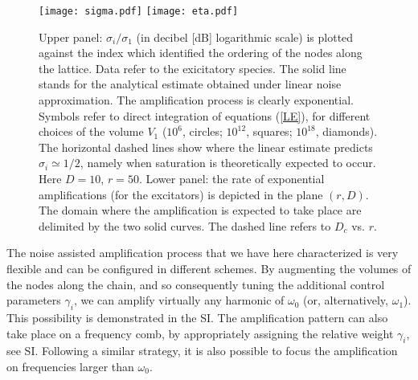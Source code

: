 \documentclass[showpacs,prl,superscriptaddress,nofootinbib, twocolumn]{revtex4}
\begin{document}
 \begin{figure}
 \centering
   {\texttt{[image: sigma.pdf]}}
   {\texttt{[image: eta.pdf]}}
   \caption{Upper panel: $\sigma_i / \sigma_1$ (in decibel [dB] logarithmic scale) is plotted against the index which identified the ordering of the nodes  along the lattice. Data refer to the exicitatory species. The solid line stands for the analytical estimate obtained under linear noise approximation. The amplification process is clearly exponential.  Symbols refer to direct integration of equations (\ref{LE}), for different choices of the volume $V_1$ ($10^6$, circles; $10^{12}$, squares; $10^{18}$, diamonds). The horizontal dashed lines show where the linear estimate predicts $\sigma_i \simeq 1/2$, namely when saturation is theoretically expected to occur. Here $D=10$, $r=50$. Lower panel: the rate of exponential amplifications (for the excitators) is  depicted in the plane $(r,D)$. The domain where the amplification is expected to take place are delimited by the two solid curves. The dashed line refers to $D_c$ vs. $r$. }
   \label{fig3}
  \end{figure}

The noise assisted amplification process that we have here characterized is very flexible and can be configured in different schemes.  By augmenting the volumes of the nodes along the chain, and so consequently tuning the additional control parameters $\gamma_i$, we can amplify  virtually any harmonic of $\omega_0$ (or, alternatively, $\omega_1$).  This possibility is demonstrated in the SI. The amplification pattern can also take place on a frequency comb, by appropriately assigning the relative weight $\gamma_i$, see SI.  Following a similar strategy, it is also possible to focus the amplification on frequencies larger than $\omega_0$.
\end{document}
